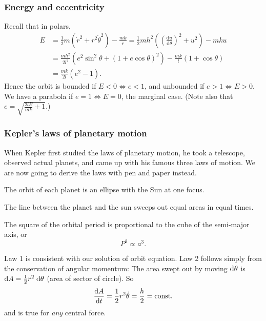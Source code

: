 \subsubsection*{Energy and eccentricity}
Recall that in polars,
\begin{align*}
    E&=\frac{1}{2}m \left( \dot{r}^2+r^2 \dot{\theta}^2 \right) - \frac{mk}{r}=\frac{1}{2}mh^2\left( \left( \frac{\mathrm{d}u}{\mathrm{d}\theta} \right)^2+u^2  \right)-mku\\
    &= \frac{mh^2}{2l^2}\left( e^2 \sin ^2 \theta+(1+e \cos\theta)^2 \right)-\frac{mk}{l}(1+ \cos \theta)\\ 
    &= \frac{mk}{2l}(e^2-1).
\end{align*}
Hence the orbit is bounded if $ E<0 \Leftrightarrow e<1 $, and unbounded if $ e>1 \Leftrightarrow E>0 $. We have a parabola if $ e=1 \Leftrightarrow E=0 $, the marginal case. (Note also that $ e=\sqrt{\frac{2lE}{mk}+1}$.)

\subsubsection*{Kepler's laws of planetary motion}
When Kepler first studied the laws of planetary motion, he took a telescope, observed actual planets, and came up with his famous three laws of motion. We are now going to derive the laws with pen and paper instead.

\begin{law}
  The orbit of each planet is an ellipse with the Sun at one focus.
\end{law}

\begin{law}
  The line between the planet and the sun sweeps out equal areas in equal times.
\end{law}

\begin{law}
  The square of the orbital period is proportional to the cube of the semi-major axis, or
  \[
    P^2 \propto a^3.
  \]
\end{law}

Law 1 is consistent with our solution of orbit equation. Law 2 follows simply from the conservation of angular momentum: The area swept out by moving $\mathrm{d} \theta$ is $\mathrm{d} A = \frac{1}{2}r^2\;\mathrm{d} \theta$ (area of sector of circle). So
\[
  \frac{\mathrm{d} A}{\mathrm{d} t} = \frac{1}{2}r^2\dot{\theta} = \frac{h}{2} = \text{const}.
\]
and is true for \emph{any} central force.

